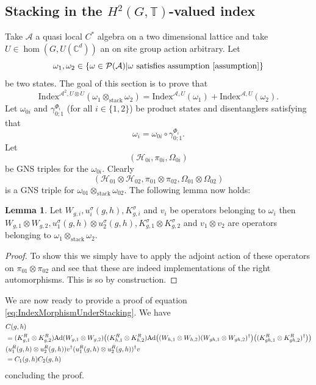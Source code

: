 \documentclass[12pt,a4paper,twoside]{article}
\let\originalleft\left
\let\originalright\right
\renewcommand{\left}{\mathopen{}\mathclose\bgroup\originalleft}
\renewcommand{\right}{\aftergroup\egroup\originalright}
\newcommand{\PP}{\mathcal P}
\newcommand{\HH}{\mathcal H}
\newcommand{\CC}{\mathbb C}
\newcommand{\TT}{\mathbb T}
\renewcommand{\AA}{\mathcal A}
\newcommand{\Ad}[1]{\textrm{Ad}\left(#1\right)}
\theoremstyle{definition}
\newtheorem{lemma}[theorem]{Lemma}
\numberwithin{equation}{section}
\begin{document}
\subsection{Stacking in the $H^2(G,\TT)$-valued index}\label{sec:StackingOneTranslation}
Take $\AA$ a quasi local $C^*$ algebra on a two dimensional lattice and take $U\in\hom(G,U(\CC^d))$ an on site group action arbitrary. Let
\begin{equation}
	\omega_1,\omega_2\in\{\omega\in\PP(\AA)|\omega\text{ satisfies assumption \ref{assumption}}\}
\end{equation}
be two states. The goal of this section is to prove that
\begin{equation}\label{eq:IndexMorphismUnderStacking}
	\textrm{Index}^{\AA^2,U\otimes U}(\omega_1\otimes_{\text{stack}}\omega_2)=\textrm{Index}^{\AA,U}(\omega_1)+\textrm{Index}^{\AA,U}(\omega_2).
\end{equation}
Let $\omega_{0i}$ and $\gamma_{0;1}^{\Phi_i}$ (for all $i\in\{1,2\}$) be product states and disentanglers satisfying that
\begin{equation}
	\omega_i=\omega_{0i}\circ\gamma_{0;1}^{\Phi_i}.
\end{equation}
Let
\begin{equation}
	(\HH_{0i},\pi_{0i},\Omega_{0i})
\end{equation}
be GNS triples for the $\omega_{0i}$. Clearly
\begin{equation}
	(\HH_{01}\otimes\HH_{02},\pi_{01}\otimes\pi_{02},\Omega_{01}\otimes\Omega_{02})
\end{equation}
is a GNS triple for $\omega_{01}\otimes_{\text{stack}}\omega_{02}$. The following lemma now holds:
\begin{lemma}
	Let $W_{g,i},u^\sigma_i(g,h),K_{g,i}^\sigma$ and $v_{i}$ be operators belonging to $\omega_i$ then $W_{g,1}\otimes W_{g,2},u^\sigma_1(g,h)\otimes u^\sigma_2(g,h),K_{g,1}^\sigma\otimes K_{g,2}^\sigma$ and $v_{1}\otimes v_{2}$ are operators belonging to $\omega_1\otimes_{\text{stack}}\omega_2$.
\end{lemma}
\begin{proof}
	To show this we simply have to apply the adjoint action of these operators on $\pi_{01}\otimes\pi_{02}$ and see that these are indeed implementations of the right automorphisms. This is so by construction.
\end{proof}
We are now ready to provide a proof of equation \ref{eq:IndexMorphismUnderStacking}. We have
\begin{align}
	&C(g,h)\\
	\nonumber
	&=(K_{g,1}^R\otimes K_{g,2}^R)\Ad{W_{g,1}\otimes W_{g,2}}\left((K_{h,1}^R\otimes K_{h,2}^R)\Ad{(W_{h,1}\otimes W_{h,2})(W_{gh,1}\otimes W_{gh,2})^\dagger}\left((K_{gh,1}^R\otimes K_{gh,2}^R)^\dagger\right)\right)\\
	&(u^R_1(g,h)\otimes u^R_2(g,h))v^\dagger (u^R_1(g,h)\otimes u^R_2(g,h))^\dagger v\\
	&=C_1(g,h)C_2(g,h)
\end{align}
concluding the proof.

\end{document}
